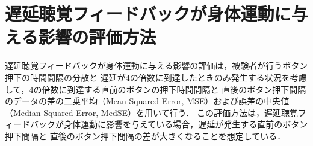 \section{遅延聴覚フィードバックが身体運動に与える影響の評価方法}
遅延聴覚フィードバックが身体運動に与える影響の評価は，被験者が行うボタン押下の時間間隔の分散と
遅延が4の倍数に到達したときのみ発生する状況を考慮して，4の倍数に到達する直前のボタンの押下時間間隔と
直後のボタン押下間隔のデータの差の二乗平均（Mean Squared Error, MSE）および誤差の中央値（Median Squared Error, MedSE）を用いて行う．
この評価方法は，遅延聴覚フィードバックが身体運動に影響を与えている場合，遅延が発生する直前のボタン押下間隔と
直後のボタン押下間隔の差が大きくなることを想定している．
